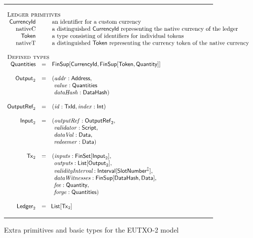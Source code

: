 \documentclass[a4paper]{article}
\renewcommand{\i}{\textit}  %
\newcommand{\s}{\textsf}  %
\newcommand{\msf}[1]{\ensuremath{\mathsf{#1}}}
\newcommand{\mi}[1]{\ensuremath{\mathit{#1}}}
\newcommand\rfskip{7pt}
\newenvironment{ruledfigure}[1]{\begin{figure}[#1]\hrule\vspace{\rfskip}}{\vspace{\rfskip}\hrule\end{figure}}
\newcommand{\List}[1]{\ensuremath{\s{List}[#1]}}
\newcommand{\FinSet}[1]{\ensuremath{\s{FinSet}[#1]}}
\newcommand{\Interval}[1]{\ensuremath{\s{Interval}[#1]}}
\newcommand{\extended}[1]{#1^\updownarrow}
\newcommand{\FinSup}[2]{\ensuremath{\s{FinSup}[#1,#2]}}
\newcommand{\script}{\ensuremath{\s{Script}}}
\newcommand{\TxId}{\ensuremath{\s{TxId}}}
\newcommand{\txrefid}{\mi{id}}
\newcommand{\Address}{\ensuremath{\s{Address}}}
\newcommand{\DataHash}{\ensuremath{\s{DataHash}}}
\newcommand{\idx}{\mi{index}}
\newcommand{\inputs}{\mi{inputs}}
\newcommand{\outputs}{\mi{outputs}}
\newcommand{\forge}{\mi{forge}}
\newcommand{\fee}{\mi{fee}}
\newcommand{\addr}{\mi{addr}}
\newcommand{\val}{\mi{value}}  %
\newcommand{\validator}{\mi{validator}}
\newcommand{\redeemer}{\mi{redeemer}}
\newcommand{\dataVal}{\mi{dataVal}}
\newcommand{\dataHsh}{\mi{dataHash}}
\newcommand{\dataWits}{\mi{dataWitnesses}}
\newcommand{\Data}{\ensuremath{\s{Data}}}
\newcommand{\outputref}{\mi{outputRef}}
\newcommand{\slotnum}{\ensuremath{\s{SlotNumber}}}
\newcommand{\eutxotx}{\msf{Tx}}
\newcommand{\qty}{\ensuremath{\s{Quantity}}}
\newcommand{\token}{\ensuremath{\s{Token}}}
\newcommand{\currency}{\ensuremath{\s{CurrencyId}}}
\newcommand{\nativeCur}{\ensuremath{\mathrm{nativeC}}}
\newcommand{\nativeTok}{\ensuremath{\mathrm{nativeT}}}
\newcommand{\qtymap}{\ensuremath{\s{Quantities}}}
\begin{document}
\begin{ruledfigure}{H}
  \begin{displaymath}
    \begin{array}{rll}
    \multicolumn{3}{l}{\textsc{Ledger primitives}}\\
    \currency  && \mbox{an identifier for a custom currency}\\
    \nativeCur && \mbox{a distinguished \currency{} representing the native currency of the ledger}\\
    \token     && \mbox{a type consisting of identifiers for individual tokens}\\
    \nativeTok && \mbox{a distinguished \token{} representing the currency token of the native currency}\\
    \\
    \multicolumn{3}{l}{\textsc{Defined types}}\\
    \qtymap   &=& \FinSup{\currency}{\FinSup{\token}{\qty}}\\
    \\
    \s{Output}_2 &=&(\addr: \Address,\\
                 & &\ \val: \qtymap\\
                 & &\ \dataHsh: \DataHash)\\
    \\
    \s{OutputRef}_2 &= &(\txrefid: \TxId, \idx: \s{Int})\\
    \\
    \s{Input}_2 &=&( \outputref: \sf{OutputRef}_2,\\
                & &\ \validator: \script,\\
                & &\ \dataVal: \Data,\\
                & &\ \redeemer: \Data)\\
    \\
    \eutxotx_2 &=&(\inputs: \FinSet{\s{Input}_2},\\
               & &\ \outputs: \List{\s{Output}_2},\\
               & &\ \i{validityInterval}: \Interval{\extended{\slotnum}},\\
               & &\ \dataWits: \FinSup{\DataHash}{\Data},\\
               & &\ \fee: \qty,\\
               & &\ \forge: \qtymap)\\
    \\
    \s{Ledger}_2 &=&\!\List{\eutxotx_2}\\
    \end{array}
  \end{displaymath}
  \caption{Extra primitives and basic types for the EUTXO-2 model}
  \label{fig:eutxo-2-types}
\end{ruledfigure}
\end{document}
